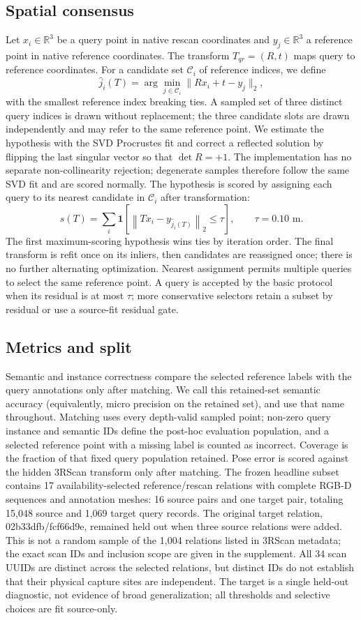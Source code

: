 \documentclass[10pt,twocolumn]{article}
\begin{document}
\subsection{Spatial consensus}
Let $x_i\in\mathbb{R}^3$ be a query point in native rescan coordinates and
$y_j\in\mathbb{R}^3$ a reference point in native reference coordinates.
The transform $T_{qr}=(R,t)$ maps query to reference coordinates. For a
candidate set $\mathcal{C}_i$ of reference indices, we define
\[
  \hat j_i(T)=\arg\min_{j\in\mathcal{C}_i}
  \|Rx_i+t-y_j\|_2,
\]
with the smallest reference index breaking ties. A sampled set of three
distinct query indices is drawn without replacement; the three candidate slots
are drawn independently and may refer to the same reference point. We estimate
the hypothesis with the SVD Procrustes fit and correct a reflected solution by
flipping the last singular vector so that $\det R=+1$. The implementation has
no separate non-collinearity rejection; degenerate samples therefore follow
the same SVD fit and are scored normally. The hypothesis is scored by
assigning each query to its nearest candidate in $\mathcal{C}_i$ after
transformation:
\[
  s(T)=\sum_i \mathbf{1}\left[
  \left\|T x_i-y_{\hat j_i(T)}\right\|_2\leq \tau\right],
  \qquad \tau=0.10\text{ m}.
\]
The first maximum-scoring hypothesis wins ties by iteration order. The final
transform is refit once on its inliers, then candidates are reassigned once;
there is no further alternating optimization. Nearest assignment permits
multiple queries to select the same reference point. A query is accepted by
the basic protocol when its residual is at most $\tau$; more conservative
selectors retain a subset by residual or use a source-fit residual gate.

\subsection{Metrics and split}
Semantic and instance correctness compare the selected reference labels with
the query annotations only after matching. We call this retained-set semantic
accuracy (equivalently, micro precision on the retained set), and use that
name throughout. Matching uses every depth-valid sampled point; non-zero
query instance and semantic IDs define the post-hoc evaluation population,
and a selected reference point with a missing label is counted as incorrect.
Coverage is the fraction of that fixed query population retained. Pose error
is scored against the hidden 3RScan transform only after matching. The frozen
headline subset contains 17 availability-selected reference/rescan relations
with complete RGB-D sequences and annotation meshes: 16 source pairs and one
target pair, totaling 15,048 source and 1,069 target query records. The original
target relation, 02b33dfb/fcf66d9e, remained held out when three source relations
were added. This is not a random sample of the 1,004 relations listed in 3RScan
metadata; the exact scan IDs and inclusion scope are given in the supplement.
All 34 scan UUIDs are distinct across the selected relations, but distinct IDs
do not establish that their physical capture sites are independent. The target
is a single held-out diagnostic, not evidence of broad generalization; all
thresholds and selective choices are fit source-only.
\end{document}
